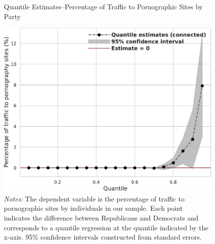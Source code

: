 \documentclass[12pt, letterpaper]{article}
\begin{document}
\begin{figure}
	\centering
	\caption{Quantile Estimates--Percentage of Traffic to Pornographic Sites by Party}
	\includegraphics[width=.6\linewidth]{figs/quantile_reg_proportion_visits_adult.pdf}
	\caption*{\footnotesize \emph{Notes:} 
		The dependent variable is the percentage of traffic to pornographic sites by individuals in our sample.
		Each point indicates the difference between Republicans and Democrats and corresponds to a quantile regression at the quantile indicated by the x-axis.
		95\% confidence intervals constructed from standard errors.
	}
	\label{fig:quantile_regression_prop_visits}
\end{figure}
\end{document}
